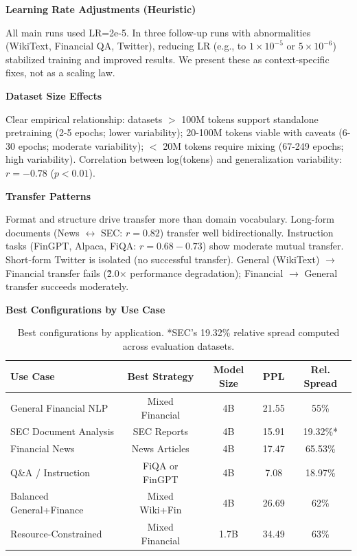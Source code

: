 \textbf{Learning Rate Adjustments (Heuristic)}

All main runs used LR=2e-5. In three follow-up runs with abnormalities (WikiText, Financial QA, Twitter), reducing LR (e.g., to $1\times10^{-5}$ or $5\times10^{-6}$) stabilized training and improved results. We present these as context-specific fixes, not as a scaling law.

\textbf{Dataset Size Effects}

Clear empirical relationship: datasets $>$ 100M tokens support standalone pretraining (2-5 epochs; lower variability); 20-100M tokens viable with caveats (6-30 epochs; moderate variability); $<$ 20M tokens require mixing (67-249 epochs; high variability). Correlation between log(tokens) and generalization variability: $r = -0.78$ ($p < 0.01$).

\textbf{Transfer Patterns}

Format and structure drive transfer more than domain vocabulary. Long-form documents (News $\leftrightarrow$ SEC: $r = 0.82$) transfer well bidirectionally. Instruction tasks (FinGPT, Alpaca, FiQA: $r = 0.68-0.73$) show moderate mutual transfer. Short-form Twitter is isolated (no successful transfer). General (WikiText) $\to$ Financial transfer fails (\~2.0$\times$ performance degradation); Financial $\to$ General transfer succeeds moderately.

\textbf{Best Configurations by Use Case}

\begin{table}[h]
\centering
\small
\begin{tabular}{lcccc}
\toprule
\textbf{Use Case} & \textbf{Best Strategy} & \textbf{Model Size} & \textbf{PPL} & \textbf{Rel. Spread} \\
\midrule
General Financial NLP & Mixed Financial & 4B & 21.55 & 55\% \\
SEC Document Analysis & SEC Reports & 4B & 15.91 & 19.32\%* \\
Financial News & News Articles & 4B & 17.47 & 65.53\% \\
Q\&A / Instruction & FiQA or FinGPT & 4B & 7.08 & 18.97\% \\
Balanced General+Finance & Mixed Wiki+Fin & 4B & 26.69 & 62\% \\
Resource-Constrained & Mixed Financial & 1.7B & 34.49 & 63\% \\
\bottomrule
\end{tabular}
\caption[Best Configurations by Application]{Best configurations by application. *SEC's 19.32\% relative spread computed across evaluation datasets.}
\end{table}

